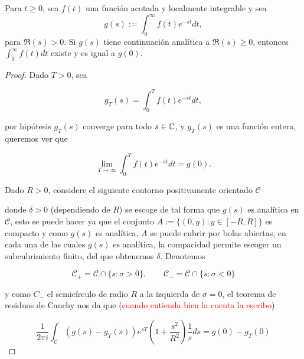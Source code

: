 \begin{theorem}
    Para $t \geq 0$, sea $f(t)$ una función acotada y localmente integrable y sea $$g(s):=\displaystyle\int_0^{\infty} f(t) e^{-s t} d t,$$
     para $\Re(s)>0$. Si $g(s)$ tiene continuación analítica a $\Re(s) \geq 0$, entonces $\displaystyle\int_0^{\infty} f(t) d t$ existe y es igual a $g(0)$.
\end{theorem}

\begin{proof}
    Dado $T>0$, sea

    $$g_T(s)=\int_0^Tf(t)e^{-st}dt,$$

    por hipótesis $g_T(s)$ converge para todo $s\in \mathbb{C}$, y $g_T(s)$ es una función entera, queremos ver que 

    $$\lim_{T \to \infty} \int_0^T f(t)e^{-st}dt=g(0).$$
 
    Dado $R>0$, considere el siguiente contorno positivamente orientado $\mathscr{C}$

    \begin{center}
    
    \end{center}

    donde $\delta>0$ (dependiendo de $R$) se escoge de tal forma que $g(s)$ es analítica en $\mathscr{C}$, esto se puede hacer ya que el conjunto $A:=\{(0,y): y\in [-R,R]\}$ es compacto y como $g(s)$ es analítica, $A$ se puede cubrir por bolas abiertas, en cada una de las cuales $g(s)$ es analítica, la compacidad permite escoger un subcubrimiento finito, del que obtenemos $\delta$.  Denotemos

    $$\mathscr{C}_+=\mathscr{C}\cap \{s:\sigma>0\},\quad \quad \mathscr{C}_-=\mathscr{C}\cap \{s:\sigma<0\}$$

    y como $C_-$ el semicírculo de radio $R$ a la izquierda de $\sigma=0$, el teorema de residuos de Cauchy nos da que (\textcolor{red}{cuando entienda bien la cuenta la escribo})

    $$\frac{1}{2\pi i}\int_{\mathscr{C}}\left(g(s)-g_T(s)\right)e^{sT}\left(1+\frac{s^2}{R^2}\right)\frac{1}{s}ds=g(0)-g_T(0)$$ 

\end{proof}

